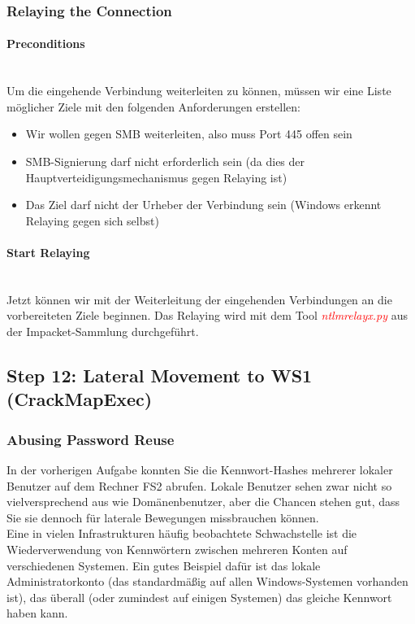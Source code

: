 \subsubsection{Relaying the Connection}

\paragraph{Preconditions}\mbox{} \\

Um die eingehende Verbindung weiterleiten zu können, müssen wir eine Liste möglicher Ziele mit den folgenden Anforderungen erstellen:

\begin{itemize}
    \item Wir wollen gegen SMB weiterleiten, also muss Port 445 offen sein
    \item SMB-Signierung darf nicht erforderlich sein (da dies der Hauptverteidigungsmechanismus gegen Relaying ist)
    \item Das Ziel darf nicht der Urheber der Verbindung sein (Windows erkennt Relaying gegen sich selbst)
\end{itemize}

\paragraph{Start Relaying}\mbox{} \\
Jetzt können wir mit der Weiterleitung der eingehenden Verbindungen an die vorbereiteten Ziele beginnen. Das Relaying wird mit dem Tool \textcolor{red}{\textit{ntlmrelayx.py}} aus der Impacket-Sammlung durchgeführt.

\subsection{Step 12: Lateral Movement to WS1 (CrackMapExec)}

\subsubsection{Abusing Password Reuse}
In der vorherigen Aufgabe konnten Sie die Kennwort-Hashes mehrerer lokaler Benutzer auf dem Rechner FS2 abrufen. Lokale Benutzer sehen zwar nicht so vielversprechend aus wie Domänenbenutzer, aber die Chancen stehen gut, dass Sie sie dennoch für laterale Bewegungen missbrauchen können.\\

Eine in vielen Infrastrukturen häufig beobachtete Schwachstelle ist die Wiederverwendung von Kennwörtern zwischen mehreren Konten auf verschiedenen Systemen. Ein gutes Beispiel dafür ist das lokale Administratorkonto (das standardmäßig auf allen Windows-Systemen vorhanden ist), das überall (oder zumindest auf einigen Systemen) das gleiche Kennwort haben kann.\\

